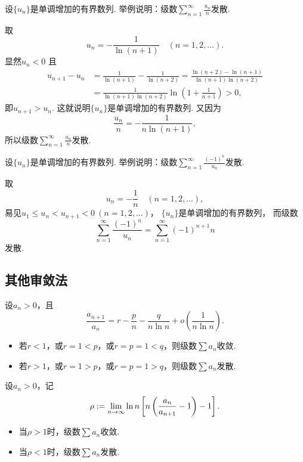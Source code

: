 \begin{example}
设\(\{u_n\}\)是单调增加的有界数列.
举例说明：级数\(\sum_{n=1}^\infty \frac{u_n}{n}\)发散.
\begin{solution}
取\[
	u_n = -\frac1{\ln(n+1)}
	\quad(n=1,2,\dotsc).
\]
显然\(u_n<0\)
且\begin{align*}
	u_{n+1} - u_n
	&= \frac1{\ln(n+1)} - \frac1{\ln(n+2)}
	= \frac{\ln(n+2)-\ln(n+1)}{\ln(n+1) \ln(n+2)} \\
	&= \frac1{\ln(n+1) \ln(n+2)} \ln\left(1+\frac1{n+1}\right)
	> 0,
\end{align*}
即\(u_{n+1} > u_n\).
这就说明\(\{u_n\}\)是单调增加的有界数列.
又因为\[
	\frac{u_n}{n}
	= -\frac1{n \ln(n+1)},
\]
所以级数\(\sum_{n=1}^\infty \frac{u_n}{n}\)发散.
\end{solution}
\end{example}

\begin{example}
设\(\{u_n\}\)是单调增加的有界数列.
举例说明：级数\(\sum_{n=1}^\infty \frac{(-1)^n}{u_n}\)发散.
\begin{solution}
取\[
	u_n = -\frac1n
	\quad(n=1,2,\dotsc),
\]
易见\(u_1 \leq u_n < u_{n+1} < 0\ (n=1,2,\dotsc)\)，
\(\{u_n\}\)是单调增加的有界数列，
而级数\[
	\sum_{n=1}^\infty \frac{(-1)^n}{u_n}
	= \sum_{n=1}^\infty (-1)^{n+1} n
\]发散.
\end{solution}
\end{example}

\subsection{其他审敛法}
\begin{theorem}
设\(a_n>0\)，且\[
	\frac{a_{n+1}}{a_n}
	= r - \frac{p}{n} - \frac{q}{n \ln n} + o\left(\frac1{n \ln n}\right).
\]
\begin{itemize}
	\item 若\(r<1\)，或\(r=1<p\)，或\(r=p=1<q\)，则级数\(\sum a_n\)收敛.
	\item 若\(r>1\)，或\(r=1>p\)，或\(r=p=1>q\)，则级数\(\sum a_n\)发散.
\end{itemize}
\end{theorem}

\begin{corollary}[贝特朗审敛法]
设\(a_n>0\)，记\[
	\rho
	:=
	\lim_{n\to\infty} \ln n \left[
		n \left( \frac{a_n}{a_{n+1}} - 1 \right) - 1
	\right].
\]
\begin{itemize}
	\item 当\(\rho>1\)时，级数\(\sum a_n\)收敛.
	\item 当\(\rho<1\)时，级数\(\sum a_n\)发散.
\end{itemize}
\end{corollary}



